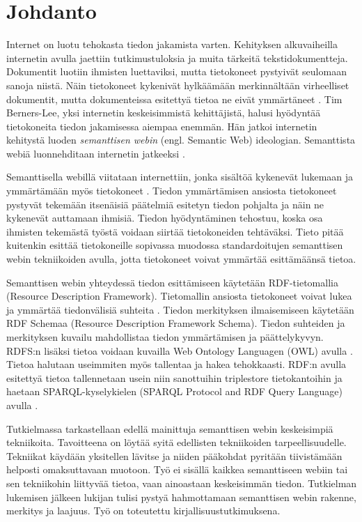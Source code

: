 \documentclass[finnish, 12pt, a4paper, elec, utf8, pdfa, online]{aaltothesis}
\begin{document}
\section{Johdanto}

\thispagestyle{empty}
Internet on luotu tehokasta tiedon jakamista varten. Kehityksen alkuvaiheilla internetin avulla jaettiin tutkimustuloksia ja muita tärkeitä tekstidokumentteja. Dokumentit luotiin ihmisten luettaviksi, mutta tietokoneet pystyivät seulomaan sanoja niistä. Näin tietokoneet kykenivät hylkäämään merkinnältään virheelliset dokumentit, mutta dokumenteissa esitettyä tietoa ne eivät ymmärtäneet \cite{WWW}. Tim Berners-Lee, yksi internetin keskeisimmistä kehittäjistä, halusi hyödyntää tietokoneita tiedon jakamisessa aiempaa enemmän. Hän jatkoi internetin kehitystä luoden \textit{semanttisen webin} (engl. Semantic Web) ideologian. Semanttista webiä luonnehditaan internetin jatkeeksi \cite{Berners_visio}.

Semanttisella webillä viitataan internettiin, jonka sisältöä kykenevät lukemaan ja ymmärtämään myös tietokoneet \cite{Berners_visio}. Tiedon ymmärtämisen ansiosta tietokoneet pystyvät tekemään itsenäisiä päätelmiä esitetyn tiedon pohjalta ja näin ne kykenevät auttamaan ihmisiä. Tiedon hyödyntäminen tehostuu, koska osa ihmisten tekemästä työstä voidaan siirtää tietokoneiden tehtäväksi. Tieto pitää kuitenkin esittää tietokoneille sopivassa muodossa standardoitujen semanttisen webin tekniikoiden avulla, jotta tietokoneet voivat ymmärtää esittämäänsä tietoa.

Semanttisen webin yhteydessä tiedon esittämiseen käytetään RDF-tietomallia (Resource Description Framework). Tietomallin ansiosta tietokoneet voivat lukea ja ymmärtää tiedonvälisiä suhteita \cite{RDF_specification}. Tiedon merkityksen ilmaisemiseen käytetään RDF Schemaa (Resource Description Framework Schema). Tiedon suhteiden ja merkityksen kuvailu mahdollistaa tiedon ymmärtämisen ja päättelykyvyn. RDFS:n lisäksi tietoa voidaan kuvailla Web Ontology Languagen (OWL) avulla \cite{OWL_specification}. Tietoa halutaan useimmiten myös tallentaa ja hakea tehokkaasti. RDF:n avulla esitettyä tietoa tallennetaan usein niin sanottuihin triplestore tietokantoihin ja haetaan SPARQL-kyselykielen (SPARQL Protocol and RDF Query Language) avulla \cite{sparql}.

Tutkielmassa tarkastellaan edellä mainittuja semanttisen webin keskeisimpiä tekniikoita. Tavoitteena on löytää syitä edellisten tekniikoiden tarpeellisuudelle. Tekniikat käydään yksitellen lävitse ja niiden pääkohdat pyritään tiivistämään helposti omaksuttavaan muotoon. Työ ei sisällä kaikkea semanttiseen webiin tai sen tekniikohin liittyvää tietoa, vaan ainoastaan keskeisimmän tiedon. Tutkielman lukemisen jälkeen lukijan tulisi pystyä hahmottamaan semanttisen webin rakenne, merkitys ja laajuus. Työ on toteutettu kirjallisuustutkimuksena.
\end{document}
